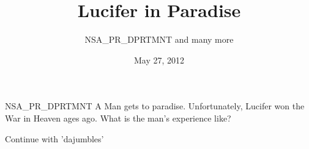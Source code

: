 \documentclass[a5paper]{book}
\title{Lucifer in Paradise}
\author{NSA\_PR\_DPRTMNT and many more}
\date{May 27, 2012}
\begin{document}
\maketitle

\begin{shadequote}[l]{NSA\_PR\_DPRTMNT}
A Man gets to paradise. Unfortunately, Lucifer won the War in Heaven ages ago. What is the man's experience like?
\end{shadequote}

\clearpage





Continue with 'dajumbles'
\end{document}
